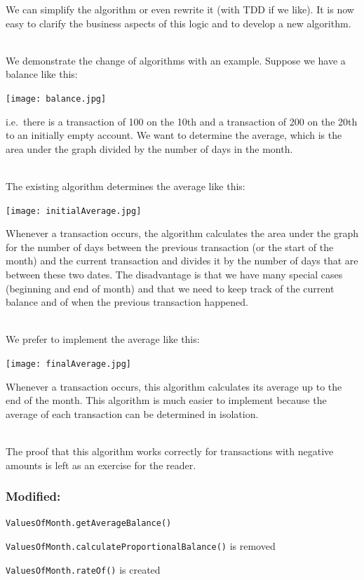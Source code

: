 \documentclass[a4paper,fleqn,titlepage,11pt]{article}
\begin{document}
We can simplify the algorithm or even rewrite it (with TDD if we like). It is now easy to clarify the business aspects of this logic and to develop a new algorithm. 
\\~

We demonstrate the change of algorithms with an example.
Suppose we have a balance like this:

\texttt{[image: balance.jpg]}

i.e.~there is a transaction of 100 on the 10th and a transaction of 200 on the 20th to an initially empty account.
We want to determine the average, which is the area under the graph divided by the number of days in the month.
\\~

The existing algorithm determines the average like this:

\texttt{[image: initialAverage.jpg]}

Whenever a transaction occurs, the algorithm calculates the area under the graph for the number of days between the previous transaction (or the start of the month) and the current transaction and divides it by the number of days that are between these two dates. The disadvantage is that we have many special cases (beginning and end of month) and that we need to keep track of the current balance and of when the previous transaction happened.
\\~

We prefer to implement the average like this:

\texttt{[image: finalAverage.jpg]}

Whenever a transaction occurs, this algorithm calculates its average up to the end of the month. This algorithm is much easier to implement because the average of each transaction can be determined in isolation.
\\~

The proof that this algorithm works correctly for transactions with negative amounts is left as an exercise for the reader.

\subsubsection*{Modified:}

\texttt{ValuesOfMonth.getAverageBalance()}

\texttt{ValuesOfMonth.calculateProportionalBalance()} is removed

\texttt{ValuesOfMonth.rateOf()} is created
\end{document}
